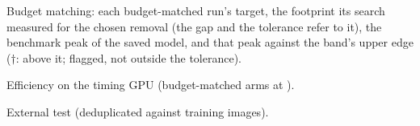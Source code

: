 \begin{table}[t]
  \centering
  \caption{Budget matching: each budget-matched run's target, the footprint its search
  measured for the chosen removal (the gap and the tolerance refer to it), the
  benchmark peak of the saved model, and that peak against the band's upper edge
  ($\dagger$: above it; flagged, not outside the tolerance).}
  \label{tab:budget-match}
  \resizebox{\linewidth}{!}{}
\end{table}

\begin{table}[t]
  \centering
  \caption{Efficiency on the timing GPU (budget-matched arms at ).}
  \label{tab:efficiency}
  \resizebox{\linewidth}{!}{}
\end{table}

\begin{table}[t]
  \centering
  \caption{External test (deduplicated against training images).}
  \label{tab:external}
  
\end{table}
